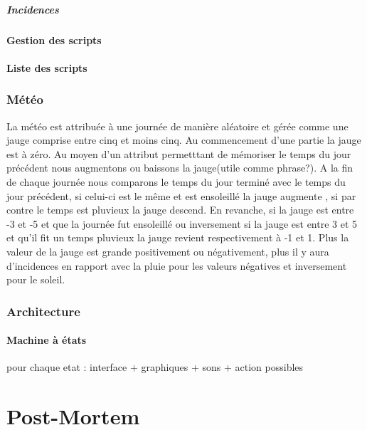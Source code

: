 \documentclass[a4paper]{article}
\begin{document}
			\subsubsection{Incidences}
			
		\subsection{Gestion des scripts}
		
		\subsection{Liste des scripts}
		
	
	\section{Météo}
	La météo est attribuée à une journée de manière aléatoire et gérée comme une jauge comprise entre cinq et moins cinq. Au commencement d'une partie la jauge est à zéro.
    Au moyen d'un attribut permetttant de mémoriser le temps du jour précédent nous augmentons ou baissons la jauge(utile comme phrase?).
	A la fin de chaque journée nous comparons le temps du jour terminé avec le temps du jour précédent, si celui-ci est le même  et est  ensoleillé la jauge augmente , si par contre le temps est pluvieux la jauge descend.
	En revanche, si la jauge est  entre -3 et -5 et que la journée fut ensoleillé ou inversement si la jauge est entre 3 et 5 et qu'il fit un temps pluvieux la jauge revient respectivement à -1 et 1.
	Plus la valeur de la jauge est grande positivement ou négativement, plus il y aura d'incidences en rapport avec la pluie pour les valeurs négatives et inversement pour le soleil.
	
	\section{Architecture}
	
		\subsection{Machine à états}
			pour chaque etat :
			interface + graphiques + sons + action possibles
	

  \newpage
  \part{Post-Mortem}
  
\end{document}
